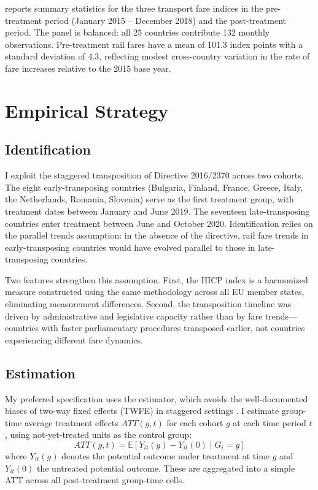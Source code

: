\documentclass[12pt]{article}
\newcommand{\E}{\mathbb{E}}
\begin{document}


 reports summary statistics for the three transport fare indices in the pre-treatment period (January 2015 -- December 2018) and the post-treatment period. The panel is balanced: all 25 countries contribute 132 monthly observations. Pre-treatment rail fares have a mean of 101.3 index points with a standard deviation of 4.3, reflecting modest cross-country variation in the rate of fare increases relative to the 2015 base year.


\section{Empirical Strategy}

\subsection{Identification}

I exploit the staggered transposition of Directive 2016/2370 across two cohorts. The eight early-transposing countries (Bulgaria, Finland, France, Greece, Italy, the Netherlands, Romania, Slovenia) serve as the first treatment group, with treatment dates between January and June 2019. The seventeen late-transposing countries enter treatment between June and October 2020. Identification relies on the parallel trends assumption: in the absence of the directive, rail fare trends in early-transposing countries would have evolved parallel to those in late-transposing countries.

Two features strengthen this assumption. First, the HICP index is a harmonized measure constructed using the same methodology across all EU member states, eliminating measurement differences. Second, the transposition timeline was driven by administrative and legislative capacity rather than by fare trends---countries with faster parliamentary procedures transposed earlier, not countries experiencing different fare dynamics.

\subsection{Estimation}

My preferred specification uses the \citet{callaway2021difference} estimator, which avoids the well-documented biases of two-way fixed effects (TWFE) in staggered settings \citep{goodmanbacon2021}. I estimate group-time average treatment effects $ATT(g,t)$ for each cohort $g$ at each time period $t$, using not-yet-treated units as the control group:
\begin{equation}
ATT(g,t) = \E[Y_{it}(g) - Y_{it}(0) \mid G_i = g]
\end{equation}
where $Y_{it}(g)$ denotes the potential outcome under treatment at time $g$ and $Y_{it}(0)$ the untreated potential outcome. These are aggregated into a simple ATT across all post-treatment group-time cells.
\end{document}
